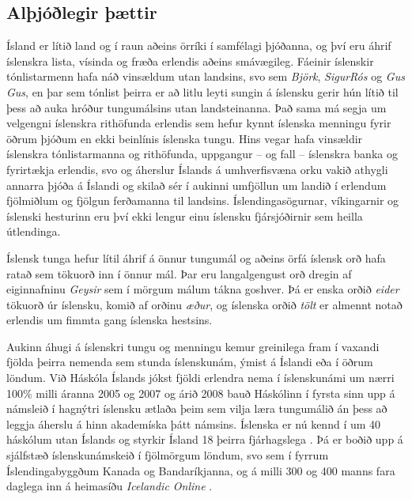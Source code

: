 \documentclass{../../metanetpaper}
\begin{document}
\begin{multicols}{2}

\subsection{Alþjóðlegir þættir}

Ísland er lítið land og í raun aðeins örríki í samfélagi þjóðanna, og því eru áhrif íslenskra lista, vísinda og fræða erlendis aðeins smávægileg. Fáeinir íslenskir tónlistarmenn hafa náð vinsældum utan landsins, svo sem \textit{Björk}, \textit{SigurRós} og \textit{Gus Gus}, en þar sem tónlist þeirra er að litlu leyti sungin á íslensku gerir hún lítið til þess að auka hróður tungumálsins utan landsteinanna. Það sama má segja um velgengni íslenskra rithöfunda erlendis sem hefur kynnt íslenska menningu fyrir öðrum þjóðum en ekki beinlínis íslenska tungu. Hins vegar hafa vinsældir íslenskra tónlistarmanna og rithöfunda, uppgangur -- og fall -- íslenskra banka og fyrirtækja erlendis, svo og áherslur Íslands á umhverfisvæna orku vakið athygli annarra þjóða á Íslandi og skilað sér í aukinni umfjöllun um landið í erlendum fjölmiðlum og fjölgun ferðamanna til landsins. Íslendingasögurnar, víkingarnir og íslenski hesturinn eru því ekki lengur einu íslensku fjársjóðirnir sem heilla útlendinga.


Íslensk tunga hefur lítil áhrif á önnur tungumál og aðeins örfá íslensk orð hafa ratað sem tökuorð inn í önnur mál. Þar eru langalgengust orð dregin af eiginnafninu \textit{Geysir} sem í mörgum málum tákna goshver. Þá er enska orðið \textit{eider} tökuorð úr íslensku, komið af orðinu \textit{æður}, og íslenska orðið \textit{tölt} er almennt notað erlendis um fimmta gang íslenska hestsins.

Aukinn áhugi á íslenskri tungu og menningu kemur greinilega fram í vaxandi fjölda þeirra nemenda sem stunda íslenskunám, ýmist á Íslandi eða í öðrum löndum. Við Háskóla Íslands jókst fjöldi erlendra nema í íslenskunámi um nærri 100\% milli áranna 2005 og 2007 og árið 2008 bauð Háskólinn í fyrsta sinn upp á námsleið í hagnýtri íslensku ætlaða þeim sem vilja læra tungumálið án þess að leggja áherslu á hinn akademíska þátt námsins. Íslenska er nú kennd í um 40 háskólum utan Íslands og styrkir Ísland 18 þeirra fjárhagslega \cite{isl1}.  Þá er boðið upp á sjálfstæð íslenskunámskeið í fjölmörgum löndum, svo sem í fyrrum Íslendingabyggðum Kanada og Bandaríkjanna, og á milli 300 og 400 manns fara daglega inn á heimasíðu \textit{Icelandic Online} \cite{iol1}. 


\end{multicols}
\end{document}
